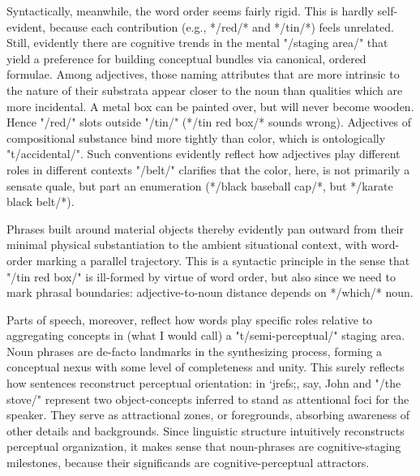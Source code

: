 Syntactically, meanwhile, the word order seems fairly rigid.  This 
is hardly self-evident, because each contribution 
(e.g., */red/* and */tin/*) feels unrelated.  Still, 
evidently there are cognitive trends in the mental 
"/staging area/" that yield a preference for 
building conceptual bundles via canonical, ordered  
formulae.  Among adjectives, those naming attributes that are 
more intrinsic to the nature of their substrata appear 
closer to the noun than qualities which are more 
incidental.  A metal box can be painted over, but will 
never become wooden.  Hence "/red/" slots  
outside "/tin/" (*/tin red box/* sounds wrong).  
Adjectives of compositional substance bind more 
tightly than color, which is ontologically "t/accidental/".  
Such conventions evidently reflect  
how adjectives play different roles in different 
contexts %
"/belt/" clarifies that the color, here, is not 
primarily a sensate quale, but part 
an enumeration (*/black baseball cap/*, but 
*/karate black belt/*).

Phrases built around material objects thereby evidently 
pan outward from their minimal physical substantiation 
to the ambient situational context, with word-order 
marking a parallel trajectory.  This is a syntactic 
principle in the sense that "/tin red box/" is ill-formed 
by virtue of word order, but also since we  
need to mark phrasal boundaries: adjective-to-noun distance 
depends on */which/* noun.

Parts of speech, moreover, reflect how words play 
specific roles relative to aggregating concepts in 
(what I would call) a "t/semi-perceptual/" staging area.  
Noun phrases are de-facto landmarks in the synthesizing 
process, forming a conceptual nexus with some 
level of completeness and unity.  This surely reflects 
how sentences reconstruct perceptual orientation: 
in `jrefs;, say, John and "/the stove/" represent two 
object-concepts inferred to stand as 
attentional foci for the speaker.  They serve 
as attractional zones, or foregrounds, absorbing 
awareness of other details and backgrounds.  Since linguistic structure
intuitively reconstructs perceptual organization, 
it makes sense that noun-phrases are cognitive-staging 
milestones, because their significands are cognitive-perceptual 
attractors.  

